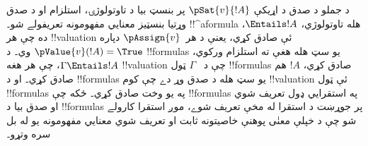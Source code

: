 \documentclass[../../../include/open-logic-section]{subfiles}
\begin{document}
د جملو د صدق د اړيکې $\pSat{v}{!A}$ پر بنسټ بيا د تاوتولوژۍ،
استلزام او د صدق وړتيا بنسټيز معنايي مفهومونه تعريفولے شو۔
!!^a{formula} هله تاوتولوژي، $\Entails !A$، ده چې هر !!{valuation}
ئې صادق کړي، يعنې د هر~$\pAssign{v}$ دپاره
$\pValue{v}(!A) = \True$ وي۔ د !!{formula}s يو سټ هله هغې ته
استلزام ورکوي، $\Gamma \Entails !A$، چې هر هغه !!{valuation} چې د
~$\Gamma$ ټول !!{formula}s صادق کړي، $!A$ هم صادق کړي۔ او د
!!{formula}s يو سټ هله د صدق وړ دے چې کوم !!{valuation} ئې ټول
!!{formula}s په يو وخت صادق کړي۔ ځکه چې !!{formula}s په استقرايي
ډول تعريف شوي او صدق بيا د !!{formula}s پر جوړښت د استقرا له مخې
تعريف شوے، موږ استقرا کارولے شو چې د خپلې معنٰی پوهنې خاصيتونه ثابت
او تعريف شوي معنايي مفهومونه يو له بل سره وتړو۔
\end{document}
